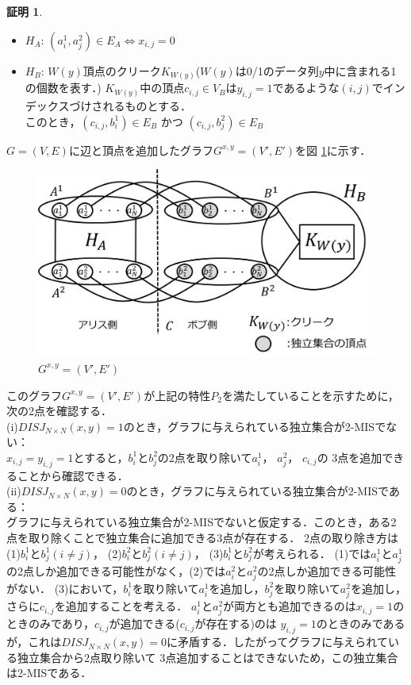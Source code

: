 \documentclass[12pt]{thesis}
\theoremstyle{definition}
\newtheorem*{prf*}{証明}
\begin{document}
\begin{prf*}
\newpage
\begin{itemize}
\item $H_{A}$: $(a_{i}^{1}, a_{j}^{2}) \in E_{A} \Leftrightarrow x_{i, j} = 0$
\item $H_{B}$: $W(y)$頂点のクリーク$K_{W(y)}$($W(y)$は0/1のデータ列$y$中に含まれる1の個数を表す．)
$K_{W(y)}$中の頂点$c_{i, j} \in V_{B}$は$y_{i, j} = 1$であるような$(i, j)$でインデックスづけされるものとする． \\
このとき，$(c_{i, j}, b_{i}^{1}) \in E_{B}$ かつ $(c_{i, j}, b_{j}^{2}) \in E_{B}$
\end{itemize}

$G = (V, E)$に辺と頂点を追加したグラフ$G^{x, y} = (V', E')$を図 \ref{2_G(x,y)}に示す．

\begin{figure}[ht]
\begin{center}
\includegraphics[width=120mm]{2_Gxy.png}
\end{center}
\caption{$G^{x, y} = (V', E')$}
\label{2_G(x,y)}
\end{figure}

このグラフ$G^{x, y} = (V', E')$が上記の特性$P_{2}$を満たしていることを示すために，次の2点を確認する． \\
(i)$DISJ_{N \times N} (x, y) = 1$のとき，グラフに与えられている独立集合が2-MISでない： \\
$x_{i, j} = y_{i, j} =1$とすると，$b_{i}^{1}$と$b_{j}^{2}$の2点を取り除いて$a_{i}^{1}$， $a_{j}^{2}$， $c_{i, j}$の
3点を追加できることから確認できる． \\
(ii)$DISJ_{N \times N} (x, y) = 0$のとき，グラフに与えられている独立集合が2-MISである： \\ 
グラフに与えられている独立集合が2-MISでないと仮定する．このとき，ある2点を取り除くことで独立集合に追加できる3点が存在する．
2点の取り除き方は(1)$b_{i}^{1}$と$b_{j}^{1}(i \neq j)$， (2)$b_{i}^{2}$と$b_{j}^{2}(i \neq j)$， (3)$b_{i}^{1}$と$b_{j}^{2}$が考えられる．
(1)では$a_{i}^{1}$と$a_{j}^{1}$の2点しか追加できる可能性がなく，(2)では$a_{i}^{2}$と$a_{j}^{2}$の2点しか追加できる可能性がない．
(3)において，$b_{i}^{1}$を取り除いて$a_{i}^{1}$を追加し，$b_{j}^{2}$を取り除いて$a_{j}^{2}$を追加し，さらに$c_{i, j}$を追加することを考える．
$a_{i}^{1}$と$a_{j}^{2}$が両方とも追加できるのは$x_{i, j} = 1$のときのみであり，$c_{i, j}$が追加できる($c_{i, j}$が存在する)のは
$y_{i, j} = 1$のときのみであるが，これは$DISJ_{N \times N} (x, y) = 0$に矛盾する．したがってグラフに与えられている独立集合から2点取り除いて
3点追加することはできないため，この独立集合は2-MISである．


\end{prf*}
\end{document}
